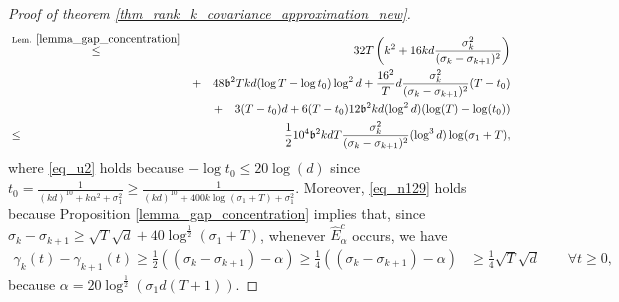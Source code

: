 \documentclass[11pt,letterpaper]{article}
\begin{document}
\begin{proof}[Proof of theorem \ref{thm_rank_k_covariance_approximation_new}]
\begin{eqnarray}
     &\stackrel{\textrm{Lem. } \ref{lemma_gap_concentration}}{\leq}& 32T\left( k^2 +   16 kd \frac{\sigma_k^2}{(\sigma_k-\sigma_{k+1})^2} \right)\nonumber \\
    & & + \quad     48 \mathfrak{b}^2 T kd (\log T- \log t_0) \log^2 d  +  \frac{16^2}{T} d \frac{\sigma_k^2}{(\sigma_k-\sigma_{k+1})^2}(T-t_0) \nonumber\\
    & & + \quad 3(T-t_0) d +  6 (T-t_0) 12 \mathfrak{b}^2  kd (\log^2 d) (\log(T)-\log(t_0))\nonumber\\
    &\leq &\frac{1}{2}10^4 \mathfrak{b}^2  kd T  \frac{\sigma_k^2}{(\sigma_k -\sigma_{k+1})^2} (\log^3 d) \log(\sigma_1 + T),   \label{eq_u2}
\end{eqnarray}
%
where \eqref{eq_u2} holds because $-\log t_0 \leq 20 \log(d)$ since  
$t_0 = \frac{1}{(kd)^{10} + k\alpha^2 +\sigma_1^2} \geq \frac{1}{(kd)^{10} + 400k\log(\sigma_1 + T) +\sigma_1^2} $.
%
Moreover, \eqref{eq_n129} holds because Proposition \ref{lemma_gap_concentration} implies that, since  $\sigma_k - \sigma_{k+1} \geq \sqrt{T} \sqrt{d} + 40\log^{\frac{1}{2}}(\sigma_1 + T)$, whenever $\hat{E}_\alpha^c$ occurs, we have 
%
\begin{align*}
    \gamma_k(t) - \gamma_{k+1}(t) \geq  \frac{1}{2}((\sigma_k - \sigma_{k+1}) - \alpha) \geq \frac{1}{4}((\sigma_k - \sigma_{k+1}) - \alpha) 
    &\geq \frac{1}{4}\sqrt{T} \sqrt{d} \qquad \forall t \geq 0,
    \end{align*}
    because $\alpha = 20\log^{\frac{1}{2}}(\sigma_1 d (T+1))$.
    

\end{proof}
\end{document}
